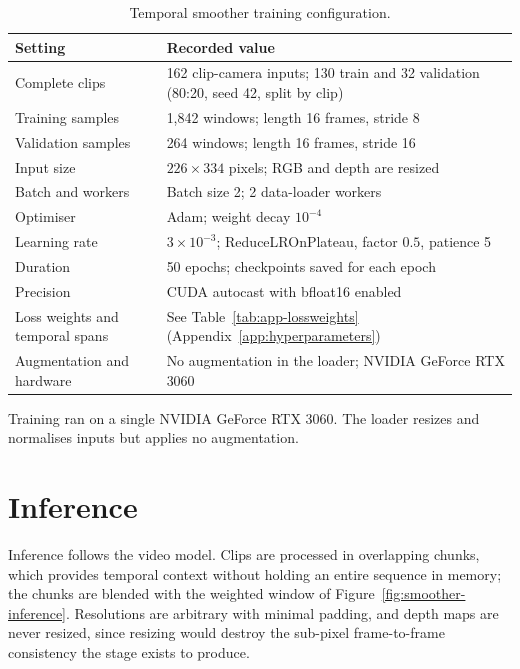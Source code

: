 \begin{table}[H]
    \caption{Temporal smoother training configuration.}
    \label{tab:smoother-training}
    \begin{center}
        \begin{tabular}{@{}p{3.6cm}p{10.4cm}@{}}
            \toprule
            Setting & Recorded value \\
            \midrule
            Complete clips & 162 clip-camera inputs; 130 train and 32 validation (80:20, seed 42, split by clip) \\
            Training samples & 1,842 windows; length 16 frames, stride 8 \\
            Validation samples & 264 windows; length 16 frames, stride 16 \\
            Input size & $226\times334$ pixels; RGB and depth are resized \\
            Batch and workers & Batch size 2; 2 data-loader workers \\
            Optimiser & Adam; weight decay $10^{-4}$ \\
            Learning rate & $3\times10^{-3}$; ReduceLROnPlateau, factor $0.5$, patience 5 \\
            Duration & 50 epochs; checkpoints saved for each epoch \\
            Precision & CUDA autocast with bfloat16 enabled \\
            Loss weights and temporal spans & See Table~\ref{tab:app-lossweights} (Appendix~\ref{app:hyperparameters}) \\

            Augmentation and hardware & No augmentation in the loader; NVIDIA GeForce RTX 3060 \\
            \bottomrule
        \end{tabular}
    \end{center}
\end{table}

Training ran on a single NVIDIA GeForce RTX 3060. The loader resizes and normalises inputs but
applies no augmentation.


\section{Inference}
\label{sec:smoother-inference}

Inference follows the video model. Clips are processed in overlapping chunks, which provides
temporal context without holding an entire sequence in memory; the chunks are blended with the
weighted window of Figure~\ref{fig:smoother-inference}. Resolutions are arbitrary with minimal
padding, and depth maps are never resized, since resizing would destroy the sub-pixel frame-to-frame
consistency the stage exists to produce.

